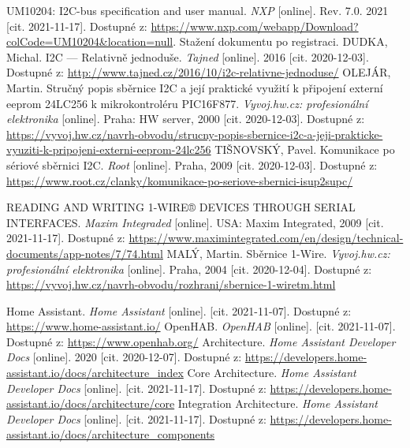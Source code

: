 \begin{thebibliography}{3}
UM10204: I2C-bus specification and user manual. \textit{NXP} [online]. Rev. 7.0. 2021 [cit. 2021-11-17]. Dostupné z: \url{https://www.nxp.com/webapp/Download?colCode=UM10204&location=null}. Stažení dokumentu po registraci.
DUDKA, Michal. I2C --- Relativně jednoduše. \textit{Tajned} [online]. 2016 [cit. 2020-12-03]. Dostupné z: \url{http://www.tajned.cz/2016/10/i2c-relativne-jednoduse/}
OLEJÁR, Martin. Stručný popis sběrnice I2C a její praktické využití k připojení externí eeprom 24LC256 k mikrokontroléru PIC16F877. \textit{Vyvoj.hw.cz: profesionální elektronika} [online]. Praha: HW server, 2000 [cit. 2020-12-03]. Dostupné z: \url{https://vyvoj.hw.cz/navrh-obvodu/strucny-popis-sbernice-i2c-a-jeji-prakticke-vyuziti-k-pripojeni-externi-eeprom-24lc256}
TIŠNOVSKÝ, Pavel. Komunikace po sériové sběrnici I2C. \textit{Root} [online]. Praha, 2009 [cit. 2020-12-03]. Dostupné z: \url{https://www.root.cz/clanky/komunikace-po-seriove-sbernici-isup2supc/}

READING AND WRITING 1-WIRE® DEVICES THROUGH SERIAL INTERFACES. \textit{Maxim Integraded} [online]. USA: Maxim Integrated, 2009 [cit. 2021-11-17]. Dostupné z: \url{https://www.maximintegrated.com/en/design/technical-documents/app-notes/7/74.html}
MALÝ, Martin. Sběrnice 1-Wire. \textit{Vyvoj.hw.cz: profesionální elektronika} [online]. Praha, 2004 [cit. 2020-12-04]. Dostupné z: \url{https://vyvoj.hw.cz/navrh-obvodu/rozhrani/sbernice-1-wiretm.html}

Home Assistant. \textit{Home Assistant} [online]. [cit. 2021-11-07]. Dostupné z: \url{https://www.home-assistant.io/}
OpenHAB. \textit{OpenHAB} [online]. [cit. 2021-11-07]. Dostupné z: \url{https://www.openhab.org/}
Architecture. \textit{Home Assistant Developer Docs} [online]. 2020 [cit. 2020-12-07]. Dostupné z: \url{https://developers.home-assistant.io/docs/architecture\_index}
Core Architecture. \textit{Home Assistant Developer Docs} [online]. [cit. 2021-11-17]. Dostupné z: \url{https://developers.home-assistant.io/docs/architecture/core}
Integration Architecture. \textit{Home Assistant Developer Docs} [online]. [cit. 2021-11-17]. Dostupné z: \url{https://developers.home-assistant.io/docs/architecture_components}



\end{thebibliography}

